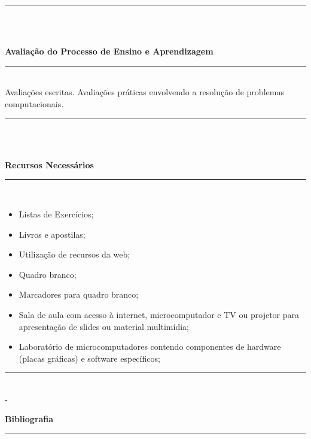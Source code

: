 \noindent\rule{16.5cm}{0.4pt}\\
\\
\vspace{-12mm}
\begin{center}\textbf{Avaliação do Processo de Ensino e Aprendizagem}\end{center}
\vspace{-5mm}
\noindent\rule{16.5cm}{0.4pt}
\\
   Avaliações escritas. Avaliações práticas envolvendo a resolução de problemas computacionais.\\
\noindent\rule{16.5cm}{0.4pt}\\
\\
\vspace{-12mm}
\begin{center}\textbf{Recursos Necessários}\end{center}
\vspace{-5mm}
\noindent\rule{16.5cm}{0.4pt}
\\
\begin{itemize} 
  \item Listas de Exercícios;
  \item Livros e apostilas;
  \item Utilização de recursos da web;
  \item Quadro branco;
  \item Marcadores para quadro branco;
  \item Sala de aula com acesso à internet, microcomputador e TV ou projetor para apresentação de slides ou material multimídia;
  \item Laboratório de microcomputadores contendo componentes de hardware (placas gráficas) e software específicos;
\end{itemize}
\noindent\rule{16.5cm}{0.4pt}\\ - 
\\
\vspace{-12mm}
\begin{center}\textbf{Bibliografia}\end{center}
\vspace{-5mm}
\noindent\rule{16.5cm}{0.4pt}
\\
